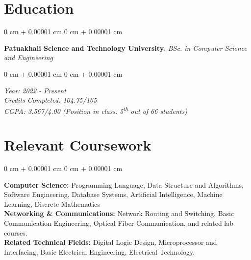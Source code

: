 \documentclass[10pt, letterpaper]{article}
\newenvironment{onecolentry}{
\begin{adjustwidth}{
0 cm + 0.00001 cm
}{
0 cm + 0.00001 cm
}
}{
\end{adjustwidth}
} %
\begin{document}
\section{Education}
\begin{onecolentry}
	\textbf{Patuakhali Science and Technology University}, \textit{BSc. in Computer Science and Engineering}
\end{onecolentry}
\vspace{0.10 cm}
\begin{onecolentry}
	\textit{Year: 2022 - Present}\\ 
	\textit{Credits Completed: 104.75/165}\\
	\textit{CGPA: 3.567/4.00 (Position in class: 5\textsuperscript{th} out of 66 students)}\\
\end{onecolentry}
\section{Relevant Coursework}
\begin{onecolentry}
	\textbf{Computer Science:} Programming Language, Data Structure and Algorithms, Software Engineering, Database Systems, Artificial Intelligence, Machine Learning, Discrete Mathematics\\
	\vspace{0.2 cm}
	\textbf{Networking \& Communications:} Network Routing and Switching, Basic Communication Engineering, Optical Fiber Communication, and related lab courses.\\
	\vspace{0.2 cm}
	\textbf{Related Technical Fields:} Digital Logic Design, Microprocessor and Interfacing, Basic Electrical Engineering, Electrical Technology.
\end{onecolentry}
\end{document}
